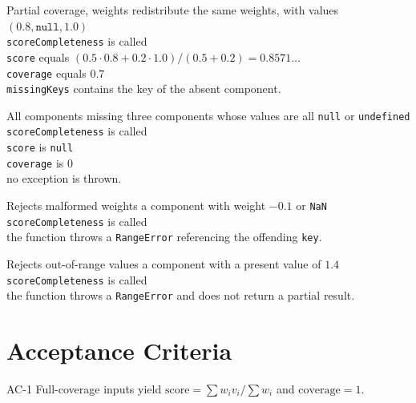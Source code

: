 \begin{scenario}{Partial coverage, weights redistribute}
\Given the same weights, with values \((0.8, \texttt{null}, 1.0)\) \\
\When \texttt{scoreCompleteness} is called \\
\Then \texttt{score} equals \((0.5 \cdot 0.8 + 0.2 \cdot 1.0) / (0.5 + 0.2) = 0.8571\ldots\) \\
\And \texttt{coverage} equals \(0.7\) \\
\And \texttt{missingKeys} contains the key of the absent component.
\end{scenario}

\begin{scenario}{All components missing}
\Given three components whose values are all \texttt{null} or \texttt{undefined} \\
\When \texttt{scoreCompleteness} is called \\
\Then \texttt{score} is \texttt{null} \\
\And \texttt{coverage} is \(0\) \\
\And no exception is thrown.
\end{scenario}

\begin{scenario}{Rejects malformed weights}
\Given a component with weight \(-0.1\) or \texttt{NaN} \\
\When \texttt{scoreCompleteness} is called \\
\Then the function throws a \texttt{RangeError} referencing the offending \texttt{key}.
\end{scenario}

\begin{scenario}{Rejects out-of-range values}
\Given a component with a present value of \(1.4\) \\
\When \texttt{scoreCompleteness} is called \\
\Then the function throws a \texttt{RangeError} and does not return a partial result.
\end{scenario}

\section{Acceptance Criteria}

\begin{ac}{AC-1}
Full-coverage inputs yield \(\mathrm{score} = \sum w_i v_i / \sum w_i\) and \(\mathrm{coverage} = 1\).
\end{ac}

